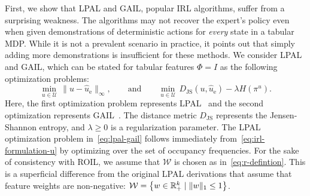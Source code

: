 First, we show that LPAL and GAIL, popular IRL algorithms, suffer from a surprising weakness. The algorithms may not recover the expert's policy even when given demonstrations of deterministic actions for \emph{every} state in a tabular MDP. While it is not a prevalent scenario in practice, it points out that simply adding more demonstrations is insufficient for these methods. We consider LPAL and GAIL, which can be stated for tabular features $\Phi = I$ as the following optimization problems:
\begin{equation} \label{eq:lpal-gail}
  \min_{u\in \mathcal{U}}\, \| u - \hat{u}_{\mathrm{e}} \|_{\infty},
  \qquad
  \text{and}
  \qquad
  \min_{u\in \mathcal{U}} \, D_{\mathrm{JS}}(u, \hat{u}_{\mathrm{e}}) - \lambda H(\pi^{u}).
\end{equation}
Here, the first optimization problem represents LPAL~\cite{Syed2008} and the second optimization represents GAIL~\cite[eq.~(15)]{Ho2016}. The distance metric $D_{\mathrm{JS}}$ represents the Jensen-Shannon entropy, and $\lambda \ge 0$ is a regularization parameter. The LPAL optimization problem in~\eqref{eq:lpal-gail} follows immediately from~\eqref{eq:irl-formulation-u} by optimizing over the set of occupancy frequencies. For the sake of consistency with ROIL, we assume that $\mathcal{W}$ is chosen as in~\eqref{eq:r-defintion}. This is a superficial difference from the original LPAL derivations that assume that feature weights are non-negative: $\mathcal{W} = \left\{ w\in \mathbb{R}^k_+ \mid \| w\|_1 \le  1  \right\}$.

